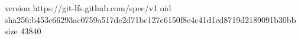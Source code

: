 version https://git-lfs.github.com/spec/v1
oid sha256:b453c66293ac0759a517de2d71be127e6150f8e4c41d1cd8719d2189091b30bb
size 43840
